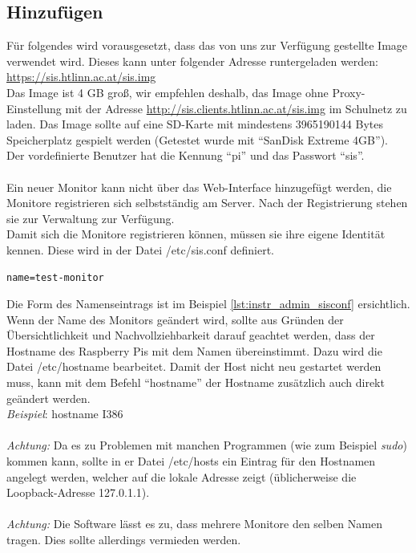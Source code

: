 \subsection{Hinzufügen}

Für folgendes wird vorausgesetzt, dass das von uns zur Verfügung gestellte Image verwendet wird. Dieses kann unter folgender Adresse runtergeladen werden:\\ \href{https://sis.htlinn.ac.at/sis.img}{https://sis.htlinn.ac.at/sis.img}\\
Das Image ist 4 GB groß, wir empfehlen deshalb, das Image ohne Proxy-Einstellung mit der Adresse \href{http://sis.clients.htlinn.ac.at/sis.img}{http://sis.clients.htlinn.ac.at/sis.img} im Schulnetz zu laden. Das Image sollte auf eine SD-Karte mit mindestens 3965190144 Bytes Speicherplatz gespielt werden (Getestet wurde mit \enquote{SanDisk Extreme 4GB}).\\
Der vordefinierte Benutzer hat die Kennung \enquote{pi} und das Passwort \enquote{sis}.\\
\\
Ein neuer Monitor kann nicht über das Web-Interface hinzugefügt werden, die Monitore registrieren sich selbstständig am Server. Nach der Registrierung stehen sie zur Verwaltung zur Verfügung.\\
Damit sich die Monitore registrieren können, müssen sie ihre eigene Identität kennen. Diese wird in der Datei /etc/sis.conf definiert.\\

\begin{lstlisting}[style=custom,  caption={Beispiel /etc/sis.conf},label={lst:instr_admin_sisconf}]
name=test-monitor
\end{lstlisting}
Die Form des Namenseintrags ist im Beispiel  \autoref{lst:instr_admin_sisconf} ersichtlich.\\
Wenn der Name des Monitors geändert wird, sollte aus Gründen der Übersichtlichkeit und Nachvollziehbarkeit darauf geachtet werden, dass der Hostname des Raspberry Pis mit dem Namen übereinstimmt. Dazu wird die Datei /etc/hostname bearbeitet. Damit der Host nicht neu gestartet werden muss, kann mit dem Befehl \enquote{hostname} der Hostname zusätzlich auch direkt geändert werden. \\
\textit{Beispiel}: hostname I386\\
\\
\textit{Achtung:} Da es zu Problemen mit manchen Programmen (wie zum Beispiel \textit{sudo}) kommen kann, sollte in er Datei /etc/hosts ein Eintrag für den Hostnamen angelegt werden, welcher auf die lokale Adresse zeigt (üblicherweise die Loopback-Adresse 127.0.1.1).\\
\\
\textit{Achtung:} Die Software lässt es zu, dass mehrere Monitore den selben Namen tragen. Dies sollte allerdings vermieden werden.

